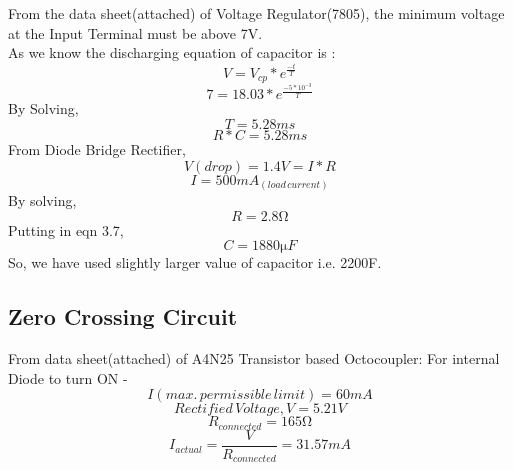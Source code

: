             
            From the data sheet(attached) of Voltage Regulator(7805), the minimum voltage at the Input Terminal must be above 7V.\\
           	As we know the discharging equation of capacitor is :
             \begin{equation}
             V=V_{cp}*e^\frac{-t}{T}
             \end{equation}
            \begin{equation}
            7=18.03*e^\frac{-5*10^{-3}}{T}
             \end{equation}
             By Solving,
             \begin{equation*}
             T=5.28ms
             \end{equation*}
              \begin{equation*}
             R*C=5.28ms
             \end{equation*}
             From Diode Bridge Rectifier,
              \begin{equation*}
             V(drop)=1.4V=I*R
             \end{equation*}
              \begin{equation*}
            I=500mA_{(load\,current)}
             \end{equation*}
       	By solving, 
       	\begin{equation}
             R=2.8{\si{\ohm}}
             \end{equation}
             Putting in eqn 3.7,
             \begin{equation}
             C=1880{\si\micro}F
             \end{equation}
             So, we have used slightly larger value of capacitor i.e. 2200{\si\micro}F.
             \subsection{Zero Crossing Circuit}
             From data sheet(attached) of A4N25 Transistor based Octocoupler:
             For internal Diode to turn ON -
             \begin{equation}
             I(max.\,permissible\,limit)=60mA
             \end{equation}
             \begin{equation}
            Rectified\,Voltage,V=5.21V
             \end{equation}
             \begin{equation}
            R_{connected}=165{\si\ohm}
             \end{equation}
             \begin{equation}
             I_{actual}=\frac{V}{R_{connected}}=31.57mA
             \end{equation}
        
